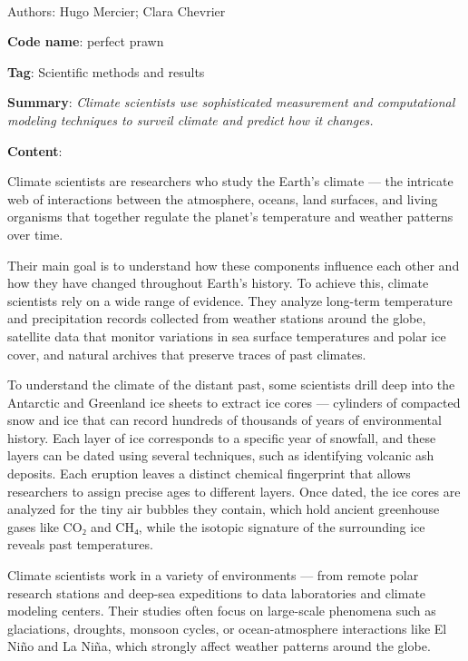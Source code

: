 \documentclass[
  letterpaper,
  DIV=11,
  numbers=noendperiod]{scrartcl}
\makeatletter
\let\oldparagraph\paragraph
\renewcommand{\paragraph}{
    \@ifstar
      \xxxParagraphStar
      \xxxParagraphNoStar
  }
\newcommand{\xxxParagraphStar}[1]{\oldparagraph*{#1}\mbox{}}
\newcommand{\xxxParagraphNoStar}[1]{\oldparagraph{#1}\mbox{}}
\makeatother
\begin{document}
\paragraph{Authors: Hugo Mercier; Clara
Chevrier}\label{authors-hugo-mercier-clara-chevrier}

\textbf{Code name}: perfect prawn

\textbf{Tag}: Scientific methods and results

\textbf{Summary}: \emph{Climate scientists use sophisticated measurement
and computational modeling techniques to surveil climate and predict how
it changes.}

\textbf{Content}:

Climate scientists are researchers who study the Earth's climate --- the
intricate web of interactions between the atmosphere, oceans, land
surfaces, and living organisms that together regulate the planet's
temperature and weather patterns over time.

Their main goal is to understand how these components influence each
other and how they have changed throughout Earth's history. To achieve
this, climate scientists rely on a wide range of evidence. They analyze
long-term temperature and precipitation records collected from weather
stations around the globe, satellite data that monitor variations in sea
surface temperatures and polar ice cover, and natural archives that
preserve traces of past climates.

To understand the climate of the distant past, some scientists drill
deep into the Antarctic and Greenland ice sheets to extract ice cores
--- cylinders of compacted snow and ice that can record hundreds of
thousands of years of environmental history. Each layer of ice
corresponds to a specific year of snowfall, and these layers can be
dated using several techniques, such as identifying volcanic ash
deposits. Each eruption leaves a distinct chemical fingerprint that
allows researchers to assign precise ages to different layers. Once
dated, the ice cores are analyzed for the tiny air bubbles they contain,
which hold ancient greenhouse gases like CO₂ and CH₄, while the isotopic
signature of the surrounding ice reveals past temperatures.

Climate scientists work in a variety of environments --- from remote
polar research stations and deep-sea expeditions to data laboratories
and climate modeling centers. Their studies often focus on large-scale
phenomena such as glaciations, droughts, monsoon cycles, or
ocean-atmosphere interactions like El Niño and La Niña, which strongly
affect weather patterns around the globe.
\end{document}
